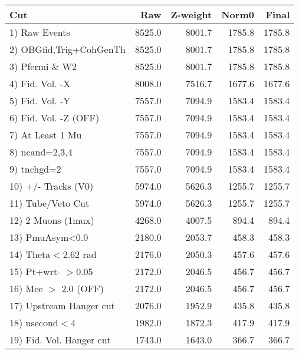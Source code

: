  \begin{table}[h!]\centering
 \begin{tabular}{||l||r|r|r|r||}
 \hline
 \hline
 Cut & Raw & Z-weight & Norm0 & Final \\
 \hline
  1) Raw Events           &      8525.0 &      8001.7 &      1785.8 &      1785.8 \\
  2) OBGfid,Trig+CohGenTh &      8525.0 &      8001.7 &      1785.8 &      1785.8 \\
  3) Pfermi \& W2         &      8525.0 &      8001.7 &      1785.8 &      1785.8 \\
  4) Fid. Vol. -X         &      8008.0 &      7516.7 &      1677.6 &      1677.6 \\
  5) Fid. Vol. -Y         &      7557.0 &      7094.9 &      1583.4 &      1583.4 \\
  6) Fid. Vol. -Z (OFF)   &      7557.0 &      7094.9 &      1583.4 &      1583.4 \\
  7) At Least 1 Mu        &      7557.0 &      7094.9 &      1583.4 &      1583.4 \\
  8) ncand=2,3,4          &      7557.0 &      7094.9 &      1583.4 &      1583.4 \\
  9) tnchgd=2             &      7557.0 &      7094.9 &      1583.4 &      1583.4 \\
 10) +/- Tracks (V0)      &      5974.0 &      5626.3 &      1255.7 &      1255.7 \\
 11) Tube/Veto Cut        &      5974.0 &      5626.3 &      1255.7 &      1255.7 \\
 12) 2 Muons (1mux)       &      4268.0 &      4007.5 &       894.4 &       894.4 \\
 13) PmuAsym<0.0          &      2180.0 &      2053.7 &       458.3 &       458.3 \\
 14) Theta$<$2.62 rad     &      2176.0 &      2050.3 &       457.6 &       457.6 \\
 15) Pt+wrt- $>$0.05      &      2172.0 &      2046.5 &       456.7 &       456.7 \\
 16) Mee $>$ 2.0  (OFF)   &      2172.0 &      2046.5 &       456.7 &       456.7 \\
 17) Upstream Hanger cut  &      2076.0 &      1952.9 &       435.8 &       435.8 \\
 18) nsecond$<$4          &      1982.0 &      1872.3 &       417.9 &       417.9 \\
 19) Fid. Vol. Hanger cut &      1743.0 &      1643.0 &       366.7 &       366.7 \\

\end{tabular}
\end{table}
